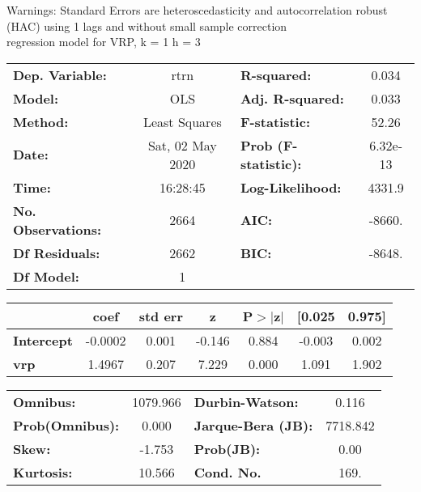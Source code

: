 Warnings: \newline
 [1] Standard Errors are heteroscedasticity and autocorrelation robust (HAC) using 1 lags and without small sample correction\\ 

regression model for VRP, k = 1 h = 3\begin{center}
\begin{tabular}{lclc}
\toprule
\textbf{Dep. Variable:}    &       rtrn       & \textbf{  R-squared:         } &     0.034   \\
\textbf{Model:}            &       OLS        & \textbf{  Adj. R-squared:    } &     0.033   \\
\textbf{Method:}           &  Least Squares   & \textbf{  F-statistic:       } &     52.26   \\
\textbf{Date:}             & Sat, 02 May 2020 & \textbf{  Prob (F-statistic):} &  6.32e-13   \\
\textbf{Time:}             &     16:28:45     & \textbf{  Log-Likelihood:    } &    4331.9   \\
\textbf{No. Observations:} &        2664      & \textbf{  AIC:               } &    -8660.   \\
\textbf{Df Residuals:}     &        2662      & \textbf{  BIC:               } &    -8648.   \\
\textbf{Df Model:}         &           1      & \textbf{                     } &             \\
\bottomrule
\end{tabular}
\begin{tabular}{lcccccc}
                   & \textbf{coef} & \textbf{std err} & \textbf{z} & \textbf{P$> |$z$|$} & \textbf{[0.025} & \textbf{0.975]}  \\
\midrule
\textbf{Intercept} &      -0.0002  &        0.001     &    -0.146  &         0.884        &       -0.003    &        0.002     \\
\textbf{vrp}       &       1.4967  &        0.207     &     7.229  &         0.000        &        1.091    &        1.902     \\
\bottomrule
\end{tabular}
\begin{tabular}{lclc}
\textbf{Omnibus:}       & 1079.966 & \textbf{  Durbin-Watson:     } &    0.116  \\
\textbf{Prob(Omnibus):} &   0.000  & \textbf{  Jarque-Bera (JB):  } & 7718.842  \\
\textbf{Skew:}          &  -1.753  & \textbf{  Prob(JB):          } &     0.00  \\
\textbf{Kurtosis:}      &  10.566  & \textbf{  Cond. No.          } &     169.  \\
\bottomrule
\end{tabular}
\end{center}

